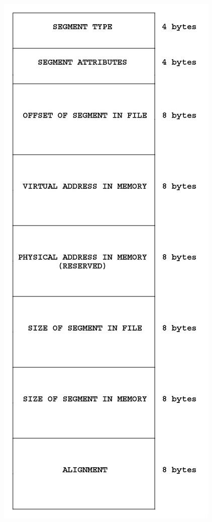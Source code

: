 \documentclass[11pt]{book}
\begin{document}
\begin{minipage}{0.35\textwidth}
\centering
\includegraphics[width=\textwidth]{pic/elf_program_header.png}
\end{minipage}
\end{document}
